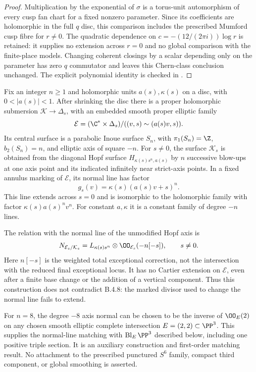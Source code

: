 \begin{proof}
Multiplication by the exponential of $\sigma$
is a torus-unit automorphism of every cusp fan
chart for a fixed nonzero parameter.  Since its
coefficients are holomorphic in the full $q$
disc, this comparison includes the prescribed
Mumford cusp fibre for $r\ne0$.  The quadratic
dependence on $c=-(12/(2\pi i))\log r$ is retained:
it supplies no extension across $r=0$ and no
global comparison with the finite-place models.
Changing coherent closings by a scalar depending
only on the parameter has zero $q$ commutator
and leaves this Chern-class conclusion unchanged.
The explicit polynomial identity is checked in
.
\end{proof}

\begin{proposition}\label{push:src:B.4.10}
Fix an integer $n\ge1$ and holomorphic units $a(s),\kappa(s)$ on a
disc, with $0<|a(s)|<1$. After shrinking the disc there is a proper
holomorphic submersion $\mathcal K\to\Delta_s$, with an embedded smooth
proper elliptic family
\[
 \mathcal E=(\C^*\times\Delta_s)/
       ((v,s)\sim(a(s)v,s)).
\]
Its central surface is a parabolic Inoue surface $S_n$, with
$\pi_1(S_n)=\Z$, $b_2(S_n)=n$, and elliptic axis of square $-n$.
For $s\ne0$, the surface $\mathcal K_s$ is obtained from the diagonal
Hopf surface $H_{\kappa(s)s^n,a(s)}$ by $n$ successive blow-ups at one
axis point and its indicated infinitely near strict-axis points.
In a fixed annulus marking of $\mathcal E$, its normal line has factor
\[
 g_s(v)=\kappa(s)(a(s)v+s)^n.
\]
This line extends across $s=0$ and is isomorphic to the holomorphic
family with factor $\kappa(s)a(s)^n v^n$.
For constant $a,\kappa$ it is a constant family of degree $-n$ lines.

The relation with the normal line of the unmodified Hopf axis is
\[
 N_{\mathcal E_s/\mathcal K_s}
   =L_{\kappa(s)s^n}\otimes\OO_{\mathcal E_s}(-n[-s]),
       \qquad s\ne0.
\]
Here $n[-s]$ is the weighted total exceptional correction, not the
intersection with the reduced final exceptional locus. It has no
Cartier extension on $\mathcal E$, even after a finite base change or
the addition of a vertical component. Thus this construction does
not contradict B.4.8: the marked divisor used to change the normal
line fails to extend.

For $n=8$, the degree $-8$ axis normal can be chosen to be the inverse
of $\OO_E(2)$ on any chosen smooth elliptic complete intersection
$E=(2,2)\subset\PP^3$. This supplies the normal-line matching with
$\operatorname{Bl}_E\PP^3$ described below, including one positive
triple section. It is an auxiliary construction and first-order
matching result. No attachment to the prescribed punctured
$S^6$ family, compact third component, or global smoothing is asserted.
\end{proposition}

